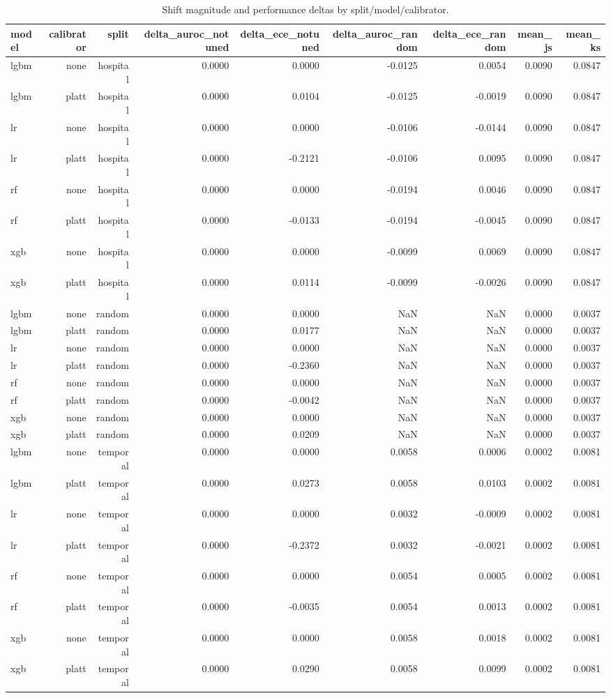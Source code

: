 \begin{table}
\caption{Shift magnitude and performance deltas by split/model/calibrator.}
\label{tab:perf-link}
\begin{tabular}{lrrrrrrrr}
\toprule
model & calibrator & split & delta\_auroc\_notuned & delta\_ece\_notuned & delta\_auroc\_random & delta\_ece\_random & mean\_js & mean\_ks \\
\midrule
lgbm & none & hospital & 0.0000 & 0.0000 & -0.0125 & 0.0054 & 0.0090 & 0.0847 \\
lgbm & platt & hospital & 0.0000 & 0.0104 & -0.0125 & -0.0019 & 0.0090 & 0.0847 \\
lr & none & hospital & 0.0000 & 0.0000 & -0.0106 & -0.0144 & 0.0090 & 0.0847 \\
lr & platt & hospital & 0.0000 & -0.2121 & -0.0106 & 0.0095 & 0.0090 & 0.0847 \\
rf & none & hospital & 0.0000 & 0.0000 & -0.0194 & 0.0046 & 0.0090 & 0.0847 \\
rf & platt & hospital & 0.0000 & -0.0133 & -0.0194 & -0.0045 & 0.0090 & 0.0847 \\
xgb & none & hospital & 0.0000 & 0.0000 & -0.0099 & 0.0069 & 0.0090 & 0.0847 \\
xgb & platt & hospital & 0.0000 & 0.0114 & -0.0099 & -0.0026 & 0.0090 & 0.0847 \\
lgbm & none & random & 0.0000 & 0.0000 & NaN & NaN & 0.0000 & 0.0037 \\
lgbm & platt & random & 0.0000 & 0.0177 & NaN & NaN & 0.0000 & 0.0037 \\
lr & none & random & 0.0000 & 0.0000 & NaN & NaN & 0.0000 & 0.0037 \\
lr & platt & random & 0.0000 & -0.2360 & NaN & NaN & 0.0000 & 0.0037 \\
rf & none & random & 0.0000 & 0.0000 & NaN & NaN & 0.0000 & 0.0037 \\
rf & platt & random & 0.0000 & -0.0042 & NaN & NaN & 0.0000 & 0.0037 \\
xgb & none & random & 0.0000 & 0.0000 & NaN & NaN & 0.0000 & 0.0037 \\
xgb & platt & random & 0.0000 & 0.0209 & NaN & NaN & 0.0000 & 0.0037 \\
lgbm & none & temporal & 0.0000 & 0.0000 & 0.0058 & 0.0006 & 0.0002 & 0.0081 \\
lgbm & platt & temporal & 0.0000 & 0.0273 & 0.0058 & 0.0103 & 0.0002 & 0.0081 \\
lr & none & temporal & 0.0000 & 0.0000 & 0.0032 & -0.0009 & 0.0002 & 0.0081 \\
lr & platt & temporal & 0.0000 & -0.2372 & 0.0032 & -0.0021 & 0.0002 & 0.0081 \\
rf & none & temporal & 0.0000 & 0.0000 & 0.0054 & 0.0005 & 0.0002 & 0.0081 \\
rf & platt & temporal & 0.0000 & -0.0035 & 0.0054 & 0.0013 & 0.0002 & 0.0081 \\
xgb & none & temporal & 0.0000 & 0.0000 & 0.0058 & 0.0018 & 0.0002 & 0.0081 \\
xgb & platt & temporal & 0.0000 & 0.0290 & 0.0058 & 0.0099 & 0.0002 & 0.0081 \\
\bottomrule
\end{tabular}
\end{table}
